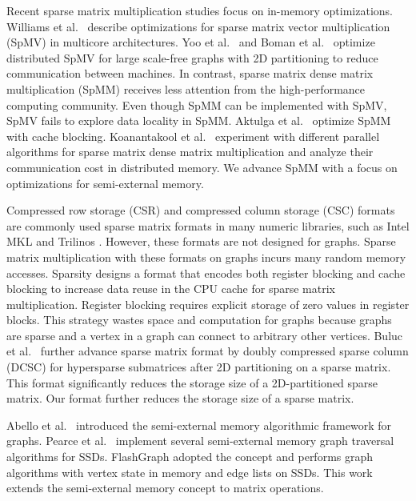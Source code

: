 Recent sparse matrix multiplication studies focus on in-memory optimizations.
Williams et al.~\cite{Williams07} describe optimizations for sparse matrix
vector multiplication (SpMV) in multicore architectures. Yoo et al.~\cite{Yoo11}
and Boman et al.~\cite{Boman2013} optimize distributed SpMV for large
scale-free graphs with 2D partitioning to reduce communication between
machines. In contrast, sparse matrix dense matrix multiplication (SpMM) receives
less attention from the high-performance computing community. Even though
SpMM can be implemented with SpMV, SpMV fails to explore data locality in
SpMM. Aktulga et al.~\cite{Aktulga14} optimize SpMM with cache blocking.
Koanantakool et al.~\cite{Koanantakool16} experiment with different parallel
algorithms for sparse matrix dense matrix multiplication and analyze
their communication cost in distributed memory.
We advance SpMM with a focus on optimizations for semi-external memory.

Compressed row storage (CSR) and compressed column storage (CSC) formats are commonly
used sparse matrix formats in many numeric libraries, such as Intel MKL \cite{mkl}
and Trilinos \cite{trilinos}. However, these formats are not designed for graphs.
Sparse matrix multiplication with these formats on graphs incurs many random memory
accesses. %
Sparsity \cite{Im04} designs a format that encodes both register blocking and cache blocking to
increase data reuse in the CPU cache for sparse matrix multiplication. Register blocking
requires explicit storage of zero values in register blocks. This strategy
wastes space and computation for graphs because graphs are sparse and
a vertex in a graph can connect to arbitrary other vertices. Buluc et al.~\cite{Buluc08}
further advance sparse matrix format
by doubly compressed sparse column (DCSC) for hypersparse submatrices after 2D
partitioning on a sparse matrix. This format significantly reduces the storage
size of a 2D-partitioned sparse matrix. Our format further reduces the storage
size of a sparse matrix.

Abello et al.~\cite{Abello98} introduced the semi-external memory algorithmic
framework for graphs. Pearce et al.~\cite{Pearce10} implement several 
semi-external memory graph traversal algorithms for SSDs. FlashGraph
\cite{FlashGraph} adopted the concept and performs graph algorithms with
vertex state in memory and edge lists on SSDs. This work extends the semi-external
memory concept to matrix operations.

